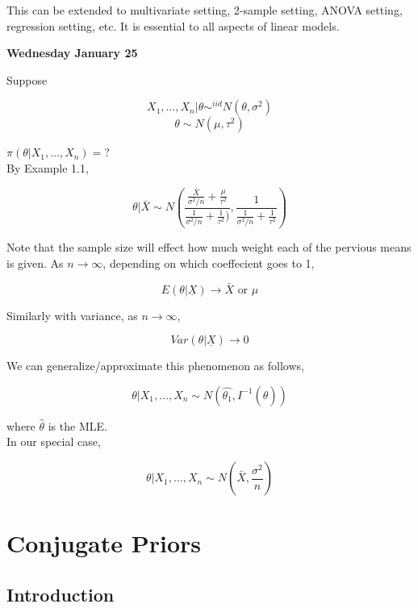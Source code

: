 \documentclass[11pt,fleqn]{book} %
\begin{document}
This can be extended to multivariate setting, 2-sample setting, ANOVA setting, regression setting, etc. It is essential to all aspects of linear models. 



\textbf{Wednesday January 25}\\

\begin{example}
	Suppose

			$$X_1, \dots, X_n | \theta \sim^{iid} N(\theta, \sigma^2) $$
			$$\theta \sim N(\mu, \tau^2) $$

	$\pi(\theta| X_1, \dots, X_n) =$?\\


	By Example 1.1, 

			$$\theta | \bar{X} \sim N\left(\frac{\frac{\bar{X}}{\sigma^2/n} + \frac{\mu}{\tau^2}}{\frac{1}{\sigma^{2}/n} + \frac{1}{\tau^{2}})}, \frac{1}{\frac{1}{\sigma^2/n} + \frac{1}{\tau^2}} \right) $$


	Note that the sample size will effect how much weight each of the pervious means is given. As $n \rightarrow \infty$, depending on which coeffecient goes to 1, 

			$$E(\theta | \underline{X}) \rightarrow \bar{X} \text{ or } \mu $$

	Similarly with variance, as $n \rightarrow \infty$, 

			$$Var(\theta| \underline{X}) \rightarrow 0 $$

	We can generalize/approximate this phenomenon as follows, 

			$$\theta|X_1, \dots, X_n \sim N(\hat{\theta_1}, I^{-1}(\hat{\theta})) $$

	where $\hat{\theta}$ is the MLE. \\

	In our special case, 

			$$\theta| X_1, \dots, X_n \sim N(\bar{X}, \frac{\sigma^2}{n}) $$


\end{example}


	\section{Conjugate Priors}

	\subsection{Introduction}
\end{document}
